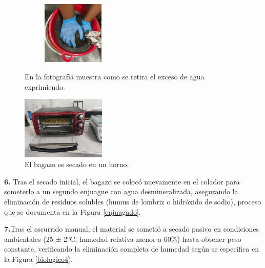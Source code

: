 \documentclass[12pt]{article}
\begin{document}
	
	

	
		\begin{figure}[H]
		\centering
		\begin{minipage}{0.46\textwidth}
			\centering
			\includegraphics[width=5cm, height=3cm]{imagenes/biologico3} %
			\caption{En la fotografía muestra como se retira el exceso de agua exprimiendo.}
			\label{biologico3}
		\end{minipage}
		\hfill
		\begin{minipage}{0.48\textwidth}
			\centering
			\includegraphics[width=4cm, height=3cm]{imagenes/secado2} %
			\caption{El bagazo es secado en un horno.}
			\label{secado2}
		\end{minipage}
	\end{figure}
	
	
	
		\textbf{6.} Tras el secado inicial, el bagazo se colocó nuevamente en el colador para someterlo a un segundo enjuague con agua desmineralizada, asegurando la eliminación de residuos solubles (humus de lombriz o hidróxido de sodio), proceso que se documenta en la Figura \ref{enjuagado}.
		
	
		
	  \textbf{7.}Tras el escurrido manual, el material se sometió a secado pasivo en condiciones ambientales (25 ± 2°C, humedad relativa menor a 60\%) hasta obtener peso constante, verificando la eliminación completa de humedad según se especifica en la Figura \ref{biologico4}.
	
\end{document}
